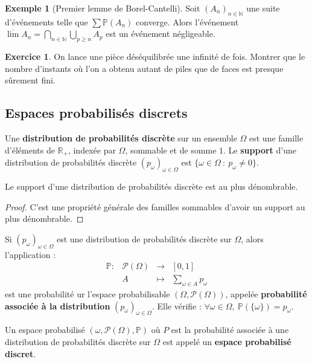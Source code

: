 \documentclass[french]{article}
\renewcommand{\P}{\mathbb{P}}
\newcommand{\N}{\mathbb{N}}
\newcommand{\R}{\mathbb{R}}
\theoremstyle{plain}
\theoremstyle{definition}
\newtheorem*{ex}{Exemple}
\newtheorem{exo}{Exercice}
\theoremstyle{remark}
\begin{document}
\begin{ex}[Premier lemme de Borel-Cantelli]
	Soit $(A_n)_{n\in\N}$ une suite d'événements telle que $\displaystyle\sum\P(A_n)$ converge. Alors l'événement $\overline{\lim}A_n=\displaystyle\bigcap_{n\in\N}\bigcup_{p\geqslant n}A_p$ est un événement négligeable.
\end{ex}

\begin{exo}
	On lance une pièce déséquilibrée une infinité de fois. Montrer que le nombre d'instants où l'on a obtenu autant de piles que de faces est presque sûrement fini.
\end{exo}

\subsection{Espaces probabilisés discrets}

\begin{dfn}
	Une \textbf{distribution de probabilités discrète} sur un ensemble $\Omega$ est une famille d'éléments de $\R_+$, indexée par $\Omega$, sommable et de somme $1$. Le \textbf{support} d'une distribution de probabilités discrète $(p_\omega)_{\omega\in\Omega}$ est $\{\omega\in\Omega\ :\ p_{\omega}\ne0\}$.
\end{dfn}

\begin{thm}{}%
	Le support d'une distribution de probabilités discrète est au plus dénombrable.
\end{thm}
\begin{proof}
	C'est une propriété générale des familles sommables d'avoir un support au plus dénombrable.
\end{proof}

\begin{thm}{}%
	Si $(p_\omega)_{\omega\in\Omega}$ est une distribution de probabilités discrète sur $\Omega$, alors l'application :
	$$\begin{array}{lrcl}
		\P:&\mathcal{P}(\Omega)&\longrightarrow&[0,1]\\
		&A&\longmapsto&\displaystyle\sum_{\omega\in A}p_\omega
	\end{array}$$ est une probabilité ur l'espace probabilisable $(\Omega,\mathcal{P}(\Omega))$, appelée \textbf{probabilité associée à la distribution} $(p_\omega)_{\omega\in\Omega}$. Elle vérifie : $\forall\omega\in\Omega,\ \P(\{\omega\})=p_\omega$.
\end{thm}

\begin{dfn}
	Un espace probabilisé $(\omega,\mathcal{P}(\Omega),\P)$ où $P$ est la probabilité associée à une distribution de probabilités discrète sur $\Omega$ est appelé un \textbf{espace probabilisé discret}.
\end{dfn}
\end{document}
